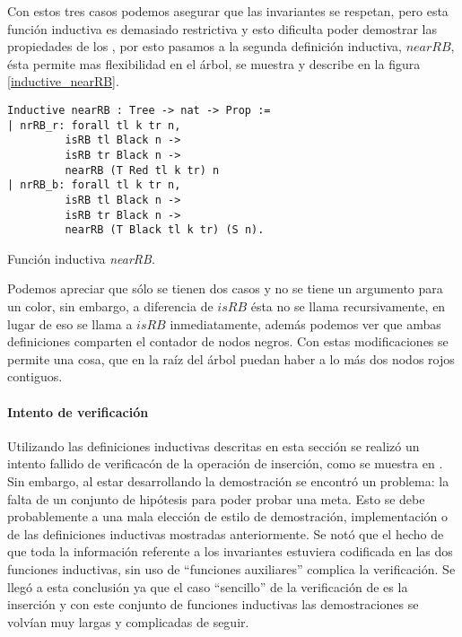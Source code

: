 Con estos tres casos podemos asegurar que las invariantes se respetan, pero esta funci\'on
inductiva es demasiado restrictiva y esto dificulta poder demostrar las propiedades de los {\arns},
por esto pasamos a la segunda definici\'on inductiva, \hyperref[inductive_nearRB]{$nearRB$}, \'esta 
permite mas flexibilidad en el \'arbol, se muestra y describe en la figura \ref{inductive_nearRB}.
\begin{listing}[!ht]
\centering
\captionsetup{justification=centering}
\begin{verbatim}
Inductive nearRB : Tree -> nat -> Prop :=
| nrRB_r: forall tl k tr n,
         isRB tl Black n ->
         isRB tr Black n ->
         nearRB (T Red tl k tr) n
| nrRB_b: forall tl k tr n,
         isRB tl Black n ->
         isRB tr Black n ->
         nearRB (T Black tl k tr) (S n).
\end{verbatim}
\caption{Funci\'on inductiva \emph{nearRB}.}
\label{inductive_nearRB}
\end{listing}

Podemos apreciar que s\'olo se tienen dos casos y no se tiene un argumento para un color, sin
embargo, a diferencia de \hyperref[inductive_isRB]{$isRB$} \'esta no se llama recursivamente, en lugar
de eso se llama a \hyperref[inductive_isRB]{$isRB$} inmediatamente, además podemos ver que ambas 
definiciones comparten el contador de nodos negros. Con estas modificaciones se permite una cosa, 
que en la ra\'iz del \'arbol puedan haber a lo m\'as dos nodos rojos contiguos.

\paragraph{Intento de verificaci\'on}
Utilizando las definiciones inductivas descritas en esta secci\'on se realiz\'o un intento fallido 
de verificac\'on de la operaci\'on de inserci\'on, como se muestra en \cite{appel}. Sin embargo, al
estar desarrollando la demostraci\'on se encontró un problema: la falta de un conjunto de
hipótesis para poder probar una meta. Esto se debe probablemente a una mala elección de estilo de
demostraci\'on, implementaci\'on o de las definiciones inductivas mostradas anteriormente. Se not\'o
que el hecho de que toda la informaci\'on referente a los invariantes estuviera codificada en las
dos funciones inductivas, sin uso de ``funciones auxiliares'' complica la verificaci\'on. Se
lleg\'o a esta conclusi\'on ya que el caso ``sencillo'' de la verificaci\'on de {\arns} es la 
inserci\'on y con este conjunto de funciones inductivas las demostraciones se volvían muy largas y
complicadas de seguir.

